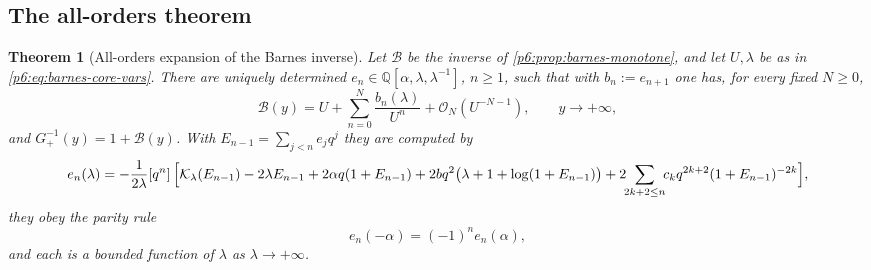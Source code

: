 \documentclass[11pt,a4paper,oneside]{book}
\theoremstyle{plain}
\newtheorem{theorem}{Theorem}[chapter]
\theoremstyle{definition}
\theoremstyle{remark}
\newcommand{\Rat}{\mathbb{Q}}
\newcommand{\Coef}[1]{[#1]\,}
\newcommand{\bigO}{\mathcal{O}}
\begin{document}
\subsection{The all-orders theorem}

\begin{theorem}[All-orders expansion of the Barnes inverse]\label{p6:thm:barnes}
Let $\mathcal{B}$ be the inverse of \cref{p6:prop:barnes-monotone}, and let
$U,\lambda$ be as in \eqref{p6:eq:barnes-core-vars}.  There are uniquely
determined $e_n\in\Rat[\alpha,\lambda,\lambda^{-1}]$, $n\ge1$, such that with
$b_n:=e_{n+1}$ one has, for every fixed $N\ge0$,
\begin{equation}\label{p6:eq:barnes-main}
 \mathcal{B}(y)=U+\sum_{n=0}^{N}\frac{b_n(\lambda)}{U^{n}}
 +\bigO_N\!\left(U^{-N-1}\right),
 \qquad y\to+\infty,
\end{equation}
and $G_+^{-1}(y)=1+\mathcal{B}(y)$.  With
$E_{n-1}=\sum_{j<n}e_jq^{j}$ they are computed by
\begin{equation}\label{p6:eq:barnes-recurrence}
 e_n(\lambda)=-\frac1{2\lambda}\Coef{q^{n}}
 \Bigl[\mathcal{K}_{\lambda}(E_{n-1})-2\lambda E_{n-1}
 +2\alpha q(1+E_{n-1})
 +2bq^{2}\bigl(\lambda+1+\log(1+E_{n-1})\bigr)
 +2\!\!\sum_{2k+2\le n}\!\!c_kq^{2k+2}(1+E_{n-1})^{-2k}\Bigr],
\end{equation}
they obey the parity rule
\begin{equation}\label{p6:eq:barnes-parity}
 e_n(-\alpha)=(-1)^{n}e_n(\alpha),
\end{equation}
and each is a bounded function of $\lambda$ as $\lambda\to+\infty$.
\end{theorem}
\end{document}
